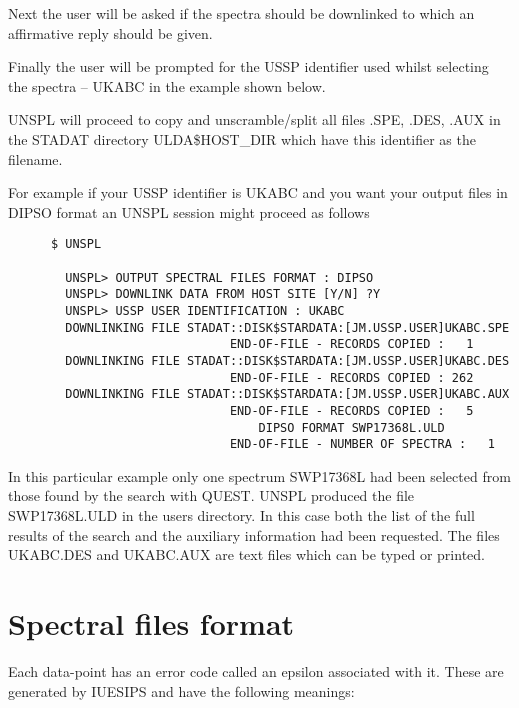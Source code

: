 Next the user will be asked if the spectra should be downlinked to which an 
affirmative reply should be given.

Finally the user will be prompted for the USSP identifier used whilst 
selecting the spectra -- UKABC in the example shown below.

UNSPL will proceed to copy and unscramble/split all files .SPE, .DES, .AUX
in the STADAT directory ULDA\$HOST\_DIR which have this identifier 
as the filename. 

For example if your USSP identifier is UKABC and you want your output files in 
DIPSO format an UNSPL session might proceed as follows
\begin{verbatim}
      $ UNSPL

        UNSPL> OUTPUT SPECTRAL FILES FORMAT : DIPSO 
        UNSPL> DOWNLINK DATA FROM HOST SITE [Y/N] ?Y 
        UNSPL> USSP USER IDENTIFICATION : UKABC
        DOWNLINKING FILE STADAT::DISK$STARDATA:[JM.USSP.USER]UKABC.SPE
                               END-OF-FILE - RECORDS COPIED :   1
        DOWNLINKING FILE STADAT::DISK$STARDATA:[JM.USSP.USER]UKABC.DES
                               END-OF-FILE - RECORDS COPIED : 262
        DOWNLINKING FILE STADAT::DISK$STARDATA:[JM.USSP.USER]UKABC.AUX
                               END-OF-FILE - RECORDS COPIED :   5
                                   DIPSO FORMAT SWP17368L.ULD    
                               END-OF-FILE - NUMBER OF SPECTRA :   1
\end{verbatim}
In this particular example only one spectrum SWP17368L had been selected 
from those found by the search with QUEST.
UNSPL produced the file SWP17368L.ULD in the users directory.
In this case both the list of the full results of the search and the
auxiliary information  had been requested.
The files UKABC.DES and UKABC.AUX are text files which can be typed or printed.

\section{Spectral files format}

Each data-point has an error code called an epsilon associated with it.
These are generated by  IUESIPS and have the following meanings:

